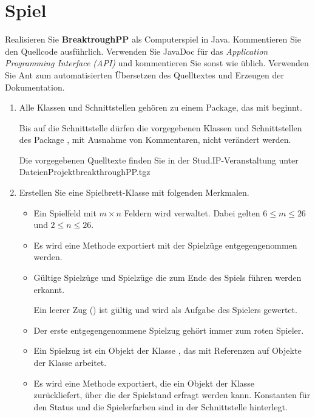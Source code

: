 \section*{Spiel}
Realisieren Sie \textbf{BreaktroughPP} als Computerspiel in Java. Kommentieren Sie den Quellcode ausführlich. Verwenden Sie JavaDoc für das \emph{Application Programming Interface (API)} und kommentieren Sie sonst wie üblich. Verwenden Sie Ant zum automatisierten Übersetzen des Quelltextes und Erzeugen der Dokumentation.

\begin{enumerate}
\item Alle Klassen und Schnittstellen gehören zu einem Package, das mit  beginnt.

Bis auf die Schnittstelle  dürfen die vorgegebenen Klassen und Schnittstellen des Package , mit Ausnahme von Kommentaren, nicht verändert werden.

Die vorgegebenen Quelltexte finden Sie in der Stud.IP-Veranstaltung unter \\
Dateien\textrightarrow Projekt\textrightarrow breakthroughPP.tgz
\item Erstellen Sie eine Spielbrett-Klasse mit folgenden Merkmalen.
\begin{itemize}
\item Ein Spielfeld mit $m \times n$ Feldern wird verwaltet. Dabei gelten $6 \le m \le 26$ und $2 \le n \le 26$.
\item Es wird eine Methode exportiert mit der Spielzüge entgegengenommen werden.
\item Gültige Spielzüge und Spielzüge die zum Ende des Spiels führen werden erkannt.

Ein leerer Zug () ist gültig und wird als Aufgabe des Spielers gewertet.
\item Der erste entgegengenommene Spielzug gehört immer zum roten Spieler.
\item Ein Spielzug ist ein Objekt der Klasse , das mit Referenzen auf Objekte der Klasse  arbeitet.



\item Es wird eine Methode exportiert, die ein Objekt der Klasse\\  zurückliefert, über die der Spielstand erfragt werden kann. Konstanten für den Status und die Spielerfarben sind in der Schnittstelle  hinterlegt.



\end{itemize}
\end{enumerate}
